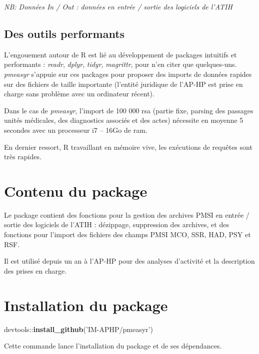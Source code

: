 \documentclass[]{book}
\newenvironment{Shaded}{\begin{snugshade}}{\end{snugshade}}
\newcommand{\KeywordTok}[1]{\textcolor[rgb]{0.13,0.29,0.53}{\textbf{{#1}}}}
\newcommand{\StringTok}[1]{\textcolor[rgb]{0.31,0.60,0.02}{{#1}}}
\newcommand{\NormalTok}[1]{{#1}}
\begin{document}
\emph{NB: Données In / Out : données en entrée / sortie des logiciels de
l'ATIH}

\subsection{Des outils performants}\label{des-outils-performants}

L'engouement autour de R est lié au développement de packages intuitifs
et performants : \emph{readr}, \emph{dplyr}, \emph{tidyr},
\emph{magrittr}, pour n'en citer que quelques-uns. \emph{pmeasyr}
s'appuie sur ces packages pour proposer des imports de données rapides
sur des fichiers de taille importante (l'entité juridique de l'AP-HP est
prise en charge sans problème avec un ordinateur récent).

Dans le cas de \emph{pmeasyr}, l'import de 100 000 rsa (partie fixe,
parsing des passages unités médicales, des diagnostics associés et des
actes) nécessite en moyenne 5 secondes avec un processeur i7 -- 16Go de
ram.

En dernier ressort, R travaillant en mémoire vive, les exécutions de
requêtes sont très rapides.

\section{Contenu du package}\label{contenu-du-package}

Le package contient des fonctions pour la gestion des archives PMSI en
entrée / sortie des logiciels de l'ATIH : dézippage, suppression des
archives, et des fonctions pour l'import des fichiers des champs PMSI
MCO, SSR, HAD, PSY et RSF.

Il est utilisé depuis un an à l'AP-HP pour des analyses d'activité et la
description des prises en charge.

\section{Installation du package}\label{installation-du-package}

\begin{Shaded}
\begin{Highlighting}[]
\NormalTok{devtools::}\KeywordTok{install_github}\NormalTok{(}\StringTok{'IM-APHP/pmeasyr'}\NormalTok{)}
\end{Highlighting}
\end{Shaded}

Cette commande lance l'installation du package et de ses dépendances.
\end{document}
